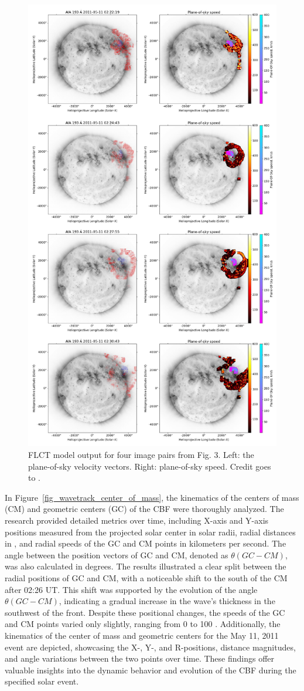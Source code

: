 \begin{figure}[!htp]
	\centering
	\includegraphics[width=0.7\hsize]{chapter2/figs/flct_wave_filament_doubleplot_figure_110511.png}
	\caption{FLCT model output for four image pairs from Fig. 3. Left: the plane-of-sky velocity vectors. Right: plane-of-sky speed. Credit goes to \citet{stepanyuk_2022}.}
	\label{fig_flct_110511}
\end{figure}

In Figure~\ref{fig_wavetrack_center_of_mass}, the kinematics of the centers of mass (CM) and geometric centers (GC) of the CBF were thoroughly analyzed. The research provided detailed metrics over time, including X-axis and Y-axis positions measured from the projected solar center in solar radii, radial distances in \rsun, and radial speeds of the GC and CM points in kilometers per second. The angle between the position vectors of GC and CM, denoted as $\theta(GC-CM)$, was also calculated in degrees. The results illustrated a clear split between the radial positions of GC and CM, with a noticeable shift to the south of the CM after 02:26 UT. This shift was supported by the evolution of the angle $\theta(GC-CM)$, indicating a gradual increase in the wave's thickness in the southwest of the front. Despite these positional changes, the speeds of the GC and CM points varied only slightly, ranging from 0 to 100 \kms. Additionally, the kinematics of the center of mass and geometric centers for the May 11, 2011 event are depicted, showcasing the X-, Y-, and R-positions, distance magnitudes, and angle variations between the two points over time. These findings offer valuable insights into the dynamic behavior and evolution of the CBF during the specified solar event.


